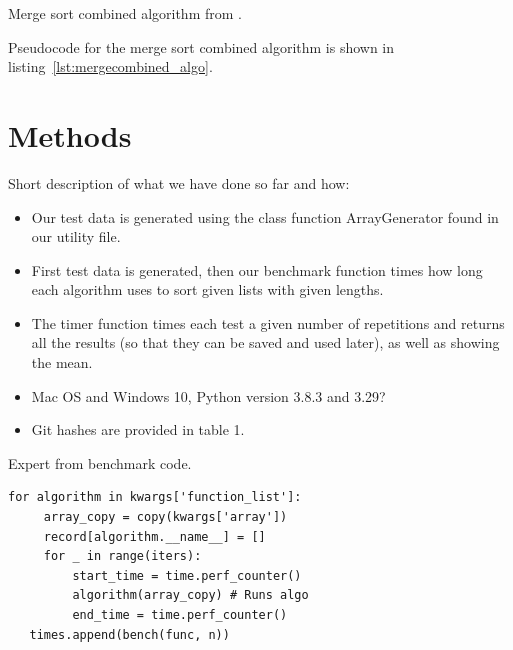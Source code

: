 \documentclass[sigconf, nonacm, natbib, screen, balance=False]{acmart}
\begin{document}
\begin{listing}
  \caption{Merge sort combined algorithm from \citet[Ch.~2.1]{CLRS_2009}.}
  \label{lst:mergecombined_algo}
  
  \begin{codebox}

  \end{codebox}
\end{listing}

Pseudocode for the merge sort combined algorithm is shown in listing~\ref{lst:mergecombined_algo}. 

\section{Methods}\label{sec:methods}

Short description of what we have done so far and how:
\begin{itemize}
\item Our test data is generated using the class function ArrayGenerator found in our utility file.
\item First test data is generated, then our benchmark function times how long each algorithm uses to sort given lists with given lengths.  
\item The timer function times each test a given number of repetitions and returns all the results (so that they can be saved and used later), as well as showing the mean.
\item Mac OS and Windows 10, Python version 3.8.3 and 3.29?
\item Git hashes are provided in table 1.
\end{itemize}

\begin{listing}
  \caption{Expert from benchmark code.}
  \label{lst:bench_setup}
  \begin{lstlisting}
for algorithm in kwargs['function_list']:
     array_copy = copy(kwargs['array'])
     record[algorithm.__name__] = []
     for _ in range(iters):
         start_time = time.perf_counter()
         algorithm(array_copy) # Runs algo
         end_time = time.perf_counter()
   times.append(bench(func, n))
   
  \end{lstlisting}
\end{listing}
\end{document}
